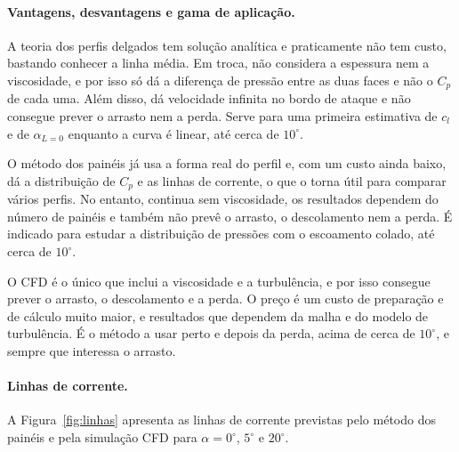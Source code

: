 \paragraph{Vantagens, desvantagens e gama de aplicação.}
A teoria dos perfis delgados tem solução analítica e praticamente não tem
custo, bastando conhecer a linha média. Em troca, não considera a espessura nem
a viscosidade, e por isso só dá a diferença de pressão entre as duas faces e não
o $C_p$ de cada uma. Além disso, dá velocidade infinita no bordo de ataque e não
consegue prever o arrasto nem a perda. Serve para uma primeira estimativa de $c_l$ e de
$\alpha_{L=0}$ enquanto a curva é linear, até cerca de $10^\circ$.

O método dos painéis já usa a forma real do perfil e, com um custo ainda baixo,
dá a distribuição de $C_p$ e as linhas de corrente, o que o torna útil para
comparar vários perfis. No entanto, continua sem viscosidade, os resultados
dependem do número de painéis e também não prevê o arrasto, o descolamento nem a
perda. É indicado para estudar a distribuição de pressões com o escoamento
colado, até cerca de $10^\circ$.

O CFD é o único que inclui a viscosidade e a turbulência, e por isso consegue
prever o arrasto, o descolamento e a perda. O preço é um custo de preparação e
de cálculo muito maior, e resultados que dependem da malha e do modelo de
turbulência. É o método a usar perto e depois da perda, acima de cerca de
$10^\circ$, e sempre que interessa o arrasto.

\paragraph{Linhas de corrente.}
A Figura~\ref{fig:linhas} apresenta as linhas de corrente previstas pelo método
dos painéis e pela simulação CFD para $\alpha = 0^\circ$, $5^\circ$ e
$20^\circ$.

